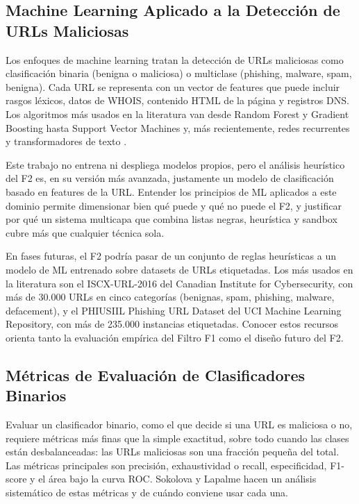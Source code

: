 \subsection{Machine Learning Aplicado a la Detecci\'on de URLs Maliciosas}

Los enfoques de machine learning tratan la detecci\'on de URLs maliciosas como clasificaci\'on binaria (benigna o maliciosa) o multiclase (phishing, malware, spam, benigna). Cada URL se representa con un vector de features que puede incluir rasgos l\'exicos, datos de WHOIS, contenido HTML de la p\'agina y registros DNS. Los algoritmos m\'as usados en la literatura van desde Random Forest y Gradient Boosting hasta Support Vector Machines y, m\'as recientemente, redes recurrentes y transformadores de texto \cite{sahoo2017malicious,ma2009beyond,le2011phishdef}.

Este trabajo no entrena ni despliega modelos propios, pero el an\'alisis heur\'istico del F2 es, en su versi\'on m\'as avanzada, justamente un modelo de clasificaci\'on basado en features de la URL. Entender los principios de ML aplicados a este dominio permite dimensionar bien qu\'e puede y qu\'e no puede el F2, y justificar por qu\'e un sistema multicapa que combina listas negras, heur\'istica y sandbox cubre m\'as que cualquier t\'ecnica sola.

En fases futuras, el F2 podr\'ia pasar de un conjunto de reglas heur\'isticas a un modelo de ML entrenado sobre datasets de URLs etiquetadas. Los m\'as usados en la literatura son el ISCX-URL-2016 del Canadian Institute for Cybersecurity, con m\'as de 30.000 URLs en cinco categor\'ias (benignas, spam, phishing, malware, defacement), y el PHIUSIIL Phishing URL Dataset del UCI Machine Learning Repository, con m\'as de 235.000 instancias etiquetadas. Conocer estos recursos orienta tanto la evaluaci\'on emp\'irica del Filtro F1 como el dise\~no futuro del F2.

\subsection{M\'etricas de Evaluaci\'on de Clasificadores Binarios}

Evaluar un clasificador binario, como el que decide si una URL es maliciosa o no, requiere m\'etricas m\'as finas que la simple exactitud, sobre todo cuando las clases est\'an desbalanceadas: las URLs maliciosas son una fracci\'on peque\~na del total. Las m\'etricas principales son precisi\'on, exhaustividad o recall, especificidad, F1-score y el \'area bajo la curva ROC. Sokolova y Lapalme \cite{sokolova2009systematic} hacen un an\'alisis sistem\'atico de estas m\'etricas y de cu\'ando conviene usar cada una.

